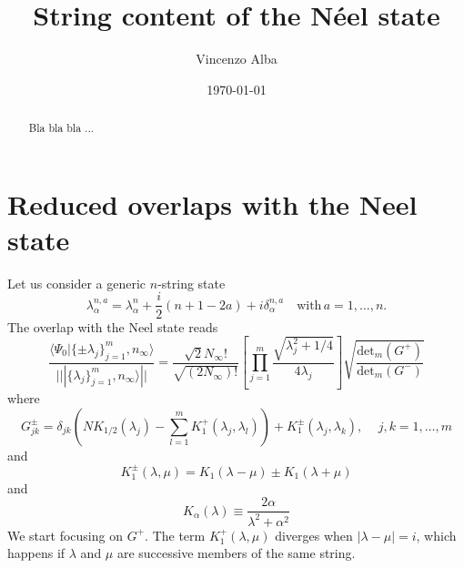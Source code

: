 \documentclass[onecolumn,superscriptaddress,pr]{revtex4}
\begin{document}
\author{Vincenzo Alba}

\date{\today}


\title{String content of the N\'eel state} 


\begin{abstract} 
Bla bla bla ...
\end{abstract}


\maketitle

\section{Reduced overlaps with the Neel state}

Let us consider a generic $n$-string state
%
\begin{equation}
\lambda_\alpha^{n,a}=\lambda_\alpha^n+\frac{i}{2}(n+1-2a)+i\delta_\alpha^{n,a}\quad\textrm{with}\, a=1,\dots, n.
\end{equation}
%
The overlap with the Neel state reads 
%
\begin{equation}
\frac{\langle\Psi_0|\{\pm\lambda_j\}_{j=1}^m,n_\infty\rangle}{|||\{\lambda_j\}_{j=1}^m,n_\infty\rangle||}=
\frac{\sqrt{2}N_{\infty}!}{\sqrt{(2N_\infty)!}}\left[\prod_{j=1}^m\frac{\sqrt{\lambda_j^2+1/4}}{4\lambda_j}\right]
\sqrt{\frac{\textrm{det}_m(G^+)}{\textrm{det}_m(G^-)}}
\end{equation}
%
where 
%
\begin{equation}
G^{\pm}_{jk}=\delta_{jk}\left(NK_{1/2}(\lambda_j)-\sum\limits_{l=1}^mK_1^+(\lambda_j,\lambda_l)\right)
+K_{1}^{\pm}(\lambda_j,\lambda_k),\quad\,j,k=1,\dots,m
\end{equation}
%
and 
%
\begin{equation}
K_1^\pm(\lambda,\mu)=K_1(\lambda-\mu)\pm K_1(\lambda+\mu)
\end{equation}
%
and 
%
\begin{equation}
K_\alpha(\lambda)\equiv\frac{2\alpha}{\lambda^2+\alpha^2}
\end{equation}
%
We start focusing on $G^+$. The term $K_1^+(\lambda,\mu)$ diverges when 
$|\lambda-\mu|=i$, which happens if $\lambda$ and $\mu$ are successive members 
of the same string. 
\end{document}
